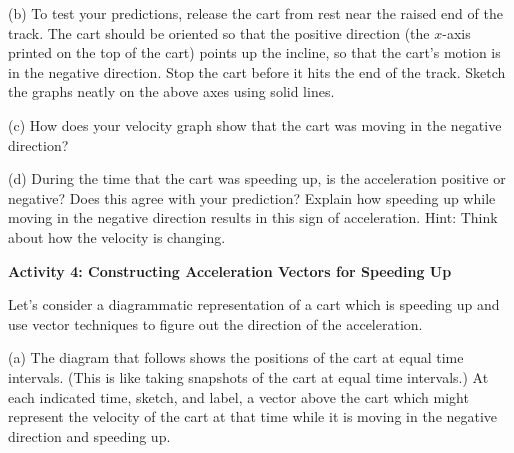 (b) To test your predictions, release the cart from rest near the raised end of the track. The cart should be oriented so that the positive direction (the $x$-axis printed on the top of the cart) points up the incline, so that the cart's motion is in the negative direction. Stop the cart before it hits the end of the track. Sketch the graphs neatly on the above axes using solid lines.

(c) How does your velocity graph show that the cart was moving in the negative direction? 
\answerspace{20mm}

(d) During the time that the cart was speeding up, is the acceleration positive
or negative? Does this agree with your prediction? Explain how speeding up while
moving in the negative direction results in this sign of acceleration. Hint: Think
about how the velocity is changing.
\answerspace{20mm}

\pagebreak[2]
\textbf{Activity 4: Constructing Acceleration Vectors for Speeding Up} 

Let's consider a diagrammatic representation of a cart which is speeding up
and use vector techniques to figure out the direction of the acceleration.

(a) The diagram that follows shows the positions of the cart at equal time intervals.
(This is like taking snapshots of the cart at equal time intervals.) At each
indicated time, sketch, and label, a vector above the cart which might represent the velocity
of the cart at that time while it is moving in the negative direction and speeding up.


